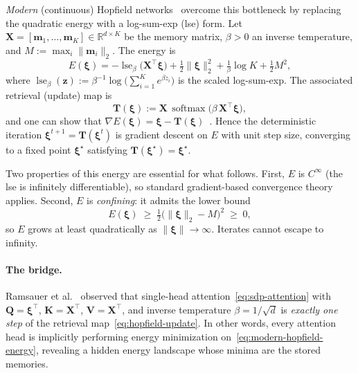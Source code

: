 \textit{Modern} (continuous) Hopfield networks~\cite{ramsauerHopfieldNetworksAll2021} overcome this bottleneck by replacing the quadratic energy with a log-sum-exp (lse) form. Let $\mathbf{X}=[\mathbf{m}_1,\dots,\mathbf{m}_K]\in\mathbb{R}^{d\times K}$ be the memory matrix, $\beta>0$ an inverse temperature, and $M:=\max_i\|\mathbf{m}_i\|_2$. The energy is
\begin{equation}\label{eq:modern-hopfield-energy}
    E(\boldsymbol{\xi})
    = -\operatorname{lse}_\beta\!\bigl(\mathbf{X}^{\top}\boldsymbol{\xi}\bigr)
      + \tfrac{1}{2}\|\boldsymbol{\xi}\|_2^2
      + \tfrac{1}{\beta}\log K
      + \tfrac{1}{2}M^2,
\end{equation}
where $\operatorname{lse}_\beta(\mathbf{z}):=\beta^{-1}\log\bigl(\sum_{i=1}^{K}e^{\beta z_i}\bigr)$ is the scaled log-sum-exp. The associated retrieval (update) map is
\begin{equation}\label{eq:hopfield-update}
    \mathbf{T}(\boldsymbol{\xi})
    := \mathbf{X}\,\operatorname{softmax}\!\bigl(\beta\,\mathbf{X}^{\top}\boldsymbol{\xi}\bigr),
\end{equation}
and one can show that $\nabla E(\boldsymbol{\xi})=\boldsymbol{\xi}-\mathbf{T}(\boldsymbol{\xi})$~\cite{ramsauerHopfieldNetworksAll2021}. Hence the deterministic iteration $\boldsymbol{\xi}^{t+1}=\mathbf{T}(\boldsymbol{\xi}^t)$ is gradient descent on $E$ with unit step size, converging to a fixed point $\boldsymbol{\xi}^{\star}$ satisfying $\mathbf{T}(\boldsymbol{\xi}^{\star})=\boldsymbol{\xi}^{\star}$.

Two properties of this energy are essential for what follows. First, $E$ is $C^{\infty}$ (the lse is infinitely differentiable), so standard gradient-based convergence theory applies. Second, $E$ is \emph{confining}: it admits the lower bound~\cite{ramsauerHopfieldNetworksAll2021}
\begin{equation}\label{eq:energy-lower-bound}
    E(\boldsymbol{\xi}) \;\ge\; \tfrac{1}{2}\bigl(\|\boldsymbol{\xi}\|_2 - M\bigr)^2 \;\ge\; 0,
\end{equation}
so $E$ grows at least quadratically as $\|\boldsymbol{\xi}\|\to\infty$. Iterates cannot escape to infinity.

\paragraph{The bridge.}
Ramsauer et al.~\cite{ramsauerHopfieldNetworksAll2021} observed that single-head attention~\eqref{eq:sdp-attention} with $\mathbf{Q}=\boldsymbol{\xi}^{\top}$, $\mathbf{K}=\mathbf{X}^{\top}$, $\mathbf{V}=\mathbf{X}^{\top}$, and inverse temperature $\beta=1/\sqrt{d}$ is \emph{exactly one step} of the retrieval map~\eqref{eq:hopfield-update}. In other words, every attention head is implicitly performing energy minimization on~\eqref{eq:modern-hopfield-energy}, revealing a hidden energy landscape whose minima are the stored memories.

